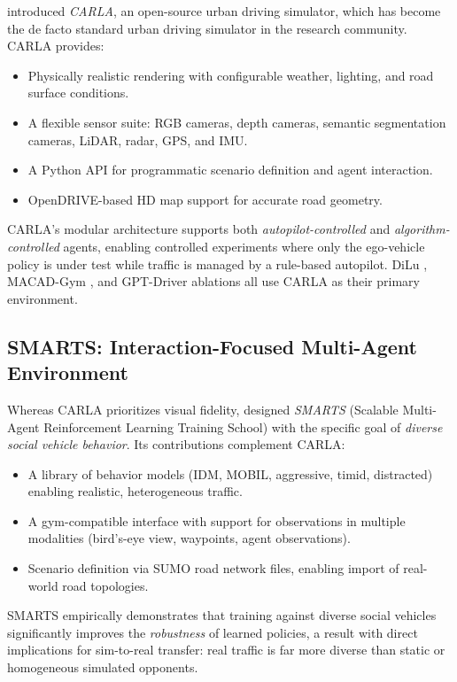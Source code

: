 \documentclass[12pt, a4paper]{article}
\begin{document}
\citet{dosovitskiy2017carlaopenurbandriving} introduced \emph{CARLA}, an open-source urban driving simulator, which
has become the de facto standard urban driving simulator in the research community.
CARLA provides:
\begin{itemize}[noitemsep]
  \item Physically realistic rendering with configurable weather, lighting, and
        road surface conditions.
  \item A flexible sensor suite: RGB cameras, depth cameras, semantic segmentation
        cameras, LiDAR, radar, GPS, and IMU.
  \item A Python API for programmatic scenario definition and agent interaction.
  \item OpenDRIVE-based HD map support for accurate road geometry.
\end{itemize}
CARLA's modular architecture supports both \emph{autopilot-controlled} and
\emph{algorithm-controlled} agents, enabling controlled experiments where only
the ego-vehicle policy is under test while traffic is managed by a rule-based
autopilot. DiLu \citep{wen2023dilu}, MACAD-Gym \citep{palanisamy2020multi}, and
GPT-Driver ablations all use CARLA as their primary environment.

\subsection{SMARTS: Interaction-Focused Multi-Agent Environment}

Whereas CARLA prioritizes visual fidelity, \citet{zhou2020smarts} designed
\emph{SMARTS} (Scalable Multi-Agent Reinforcement Learning Training School) with
the specific goal of \emph{diverse social vehicle behavior}. Its contributions
complement CARLA:
\begin{itemize}[noitemsep]
  \item A library of behavior models (IDM, MOBIL, aggressive, timid, distracted)
        enabling realistic, heterogeneous traffic.
  \item A gym-compatible interface with support for observations in multiple
        modalities (bird's-eye view, waypoints, agent observations).
  \item Scenario definition via SUMO road network files, enabling import of
        real-world road topologies.
\end{itemize}
SMARTS empirically demonstrates that training against diverse social vehicles
significantly improves the \emph{robustness} of learned policies, a result with
direct implications for sim-to-real transfer: real traffic is far more diverse
than static or homogeneous simulated opponents.
\end{document}
